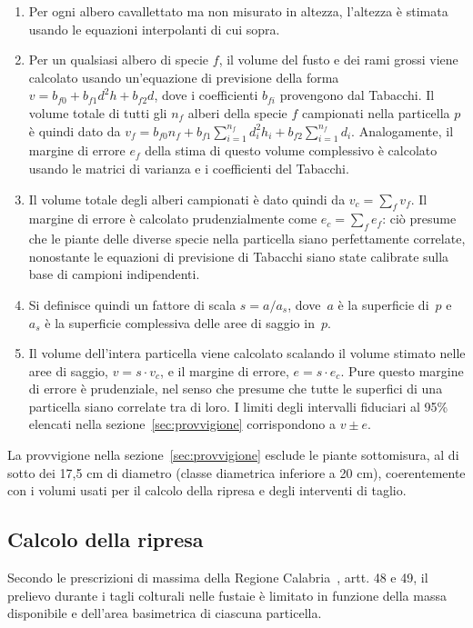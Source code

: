\documentclass[a4paper,11pt]{article}
\begin{document}
\begin{enumerate}
    \item Per ogni albero cavallettato ma non misurato in altezza, l'altezza è stimata usando le equazioni interpolanti di cui sopra.
    \item Per un qualsiasi albero di specie $f$, il volume del fusto e dei rami grossi viene calcolato usando un'equazione di previsione della forma $v = b_{f0} + b_{f1}d^2h + b_{f2}d$, dove i coefficienti $b_{fi}$ provengono dal Tabacchi. Il volume totale di tutti gli $n_f$ alberi della specie $f$ campionati nella particella $p$ è quindi dato da $v_f = b_{f0}n_f + b_{f1}\sum_{i=1}^{n_f} d_i^2h_i + b_{f2}\sum_{i=1}^{n_f} d_i$. Analogamente, il margine di errore $e_f$ della stima di questo volume complessivo è calcolato usando le matrici di varianza e i coefficienti del Tabacchi.
    \item Il volume totale degli alberi campionati è dato quindi da $v_c = \sum_{f} v_f$. Il margine di errore è calcolato prudenzialmente come $e_c = \sum_{f} e_f$: ciò presume che le piante delle diverse specie nella particella siano perfettamente correlate, nonostante le equazioni di previsione di Tabacchi siano state calibrate sulla base di campioni indipendenti.
    \item Si definisce quindi un fattore di scala $s = a / a_s$, dove~$a$ è la superficie di~$p$ e~$a_s$ è la superficie complessiva delle aree di saggio in~$p$.
    \item Il volume dell'intera particella viene calcolato scalando il volume stimato nelle aree di saggio, $v = s\cdot v_c$, e il margine di errore, $e = s\cdot e_c$. Pure questo margine di errore è prudenziale, nel senso che presume che tutte le superfici di una particella siano correlate tra di loro. I limiti degli intervalli fiduciari al 95\% elencati nella sezione~\ref{sec:provvigione} corrispondono a $v \pm e$.
\end{enumerate}

La provvigione  nella sezione~\ref{sec:provvigione} esclude le piante
sottomisura, al di sotto dei 17,5 cm di diametro (classe diametrica inferiore a
20 cm), coerentemente con i volumi usati per il calcolo della ripresa e degli
interventi di taglio.

\subsection{Calcolo della ripresa}
\label{sec:note-ripresa}

Secondo le prescrizioni di massima della Regione Calabria~\cite{calabria:2011}, artt. 48 e 49, il prelievo durante i tagli colturali nelle fustaie è limitato in funzione della massa disponibile e dell'area basimetrica di ciascuna particella.
\end{document}
